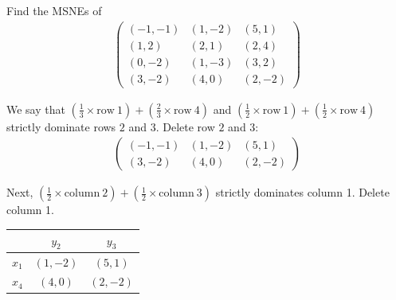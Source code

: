 \setcounter{example}{5}
\begin{example}\label{ex-5}
    Find the MSNEs of
    \begin{align*}
        \left(\begin{array}{ccc}
            (-1, -1) & (1, -2) & (5, 1)  \\
            (1, 2) & (2, 1) & (2, 4) \\
            (0, -2) & (1, -3) & (3, 2) \\
            (3, -2) & (4, 0) & (2, -2)
        \end{array} \right)
    \end{align*}
\end{example}

We say that $(\frac{1}{3}\times \mathrm{row}\ 1) + (\frac{2}{3}\times \mathrm{row}\ 4)$ and $(\frac{1}{2}\times\mathrm{row}\ 1)+ (\frac{1}{2}\times\mathrm{row}\ 4)$ strictly dominate rows $2$ and $3$. Delete row $2$ and $3$:
\begin{align*}
    \left(\begin{array}{ccc}
        (-1, -1) & (1, -2) & (5, 1)  \\
        (3, -2) & (4, 0) & (2, -2)
    \end{array} \right)
\end{align*}

Next, $(\frac{1}{2}\times\mathrm{column}\ 2) + (\frac{1}{2}\times\mathrm{column}\ 3)$ strictly dominates column 1. Delete column 1.

\begin{table}[H]
    \centering
    \begin{tabular}{|c|cc|}
    \hline
    & $y_2$ & $y_3$  \\ \hline
    $x_1$ & $(1,-2)$ & $(5, 1)$ \\
    $x_4$ & $(4, 0)$ & $(2, -2)$ \\ \hline
\end{tabular}
\end{table}

